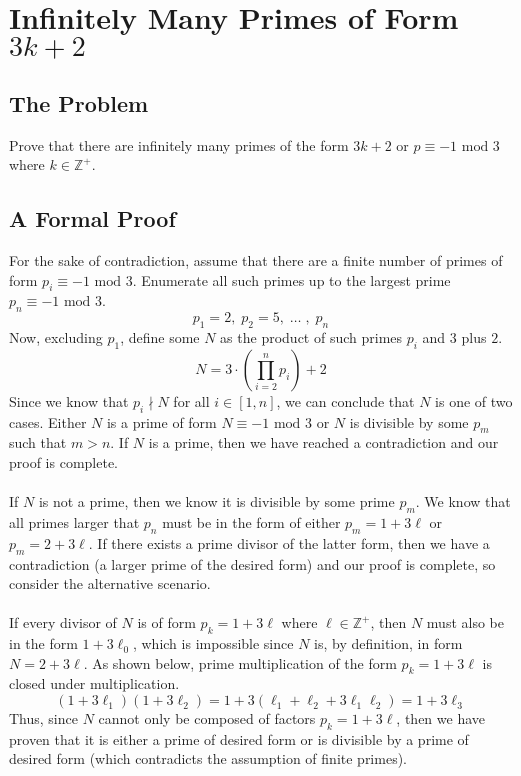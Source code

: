 \section{Infinitely Many Primes of Form $3k+2$}
\subsection{The Problem}
Prove that there are infinitely many primes of the form $3k+2$ or $p \equiv -1 \text{ mod }3$ where $k \in \mathbb{Z}^+$.
\subsection{A Formal Proof}
For the sake of contradiction, assume that there are a finite number of primes of form $p_i \equiv -1 \text{ mod } 3$. Enumerate all such primes up to the largest prime $p_n \equiv -1 \text{ mod } 3$.
$$
p_1 = 2,\;p_2 = 5,\; \dots\;,\; p_n
$$
Now, excluding $p_1$, define some $N$ as the product of such primes $p_i$ and $3$ plus $2$. 
$$
N = 3\cdot \left(\prod_{i=2}^n p_i \right) + 2
$$
Since we know that $p_i \nmid N$ for all $i \in [1,n]$, we can conclude that $N$ is one of two cases. Either $N$ is a prime of form $N \equiv -1 \text{ mod } 3$ or $N$ is divisible by some $p_m$ such that $m > n$. If $N$ is a prime, then we have reached a contradiction and our proof is complete.\\
\\
If $N$ is not a prime, then we know it is divisible by some prime $p_m$. We know that all primes larger that $p_n$ must be in the form of either $p_m = 1 + 3\ell$ or $p_m = 2 + 3\ell$. If there exists a prime divisor of the latter form, then we have a contradiction (a larger prime of the desired form) and our proof is complete, so consider the alternative scenario.\\
\\
If every divisor of $N$ is of form $p_k = 1 + 3\ell$ where $\ell \in \mathbb{Z}^+$, then $N$ must also be in the form $1+3\ell_0$, which is impossible since $N$ is, by definition, in form $N = 2 + 3\ell$. As shown below, prime multiplication of the form $p_k = 1+3\ell$ is closed under multiplication.
$$
\left(1 + 3\ell_1\right)\left(1 + 3\ell_2\right) = 1 + 3(\ell_1 + \ell_2 + 3\ell_1\ell_2) = 1 + 3\ell_3
$$
Thus, since $N$ cannot only be composed of factors $p_k = 1 + 3\ell$, then we have proven that it is either a prime of desired form or is divisible by a prime of desired form (which contradicts the assumption of finite primes).
